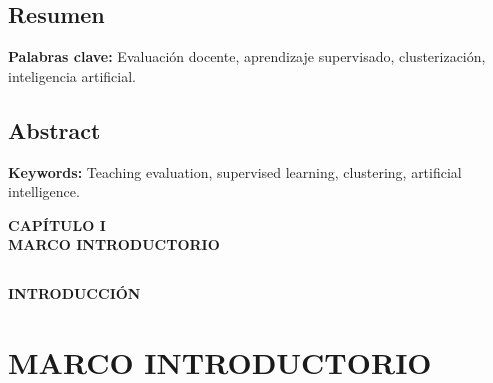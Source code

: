 \documentclass[12pt,oneside,letterpaper]{book}
\begin{document}
\newpage
\thispagestyle{empty}
\renewcommand{\listtablename}{ÍNDICE DE TABLAS}
\renewcommand{\cftlottitlefont}{\large\bfseries}
\renewcommand{\cfttabdotsep}{\cftdotsep}
\listoftables

\newpage
\thispagestyle{empty}
\renewcommand{\listfigurename}{ÍNDICE DE IMÁGENES}
\renewcommand{\cftloftitlefont}{\large\bfseries}
\renewcommand{\cftfigdotsep}{\cftdotsep}
\listoffigures

\newpage
{} %
\section*{Resumen}
\lipsum[1]

\bigskip
\noindent \textbf{Palabras clave:} Evaluación docente, aprendizaje supervisado, clusterización, inteligencia artificial.

\newpage
\section*{Abstract}
\lipsum[1]

\bigskip
\noindent \textbf{Keywords:} Teaching evaluation, supervised learning, clustering, artificial intelligence.

\newpage
{}
\thispagestyle{empty}
\vspace*{0.35\textheight}
\begin{center}
	{\Huge\textbf{CAPÍTULO I}} \\[0.5cm]
	{\Huge\textbf{MARCO INTRODUCTORIO}}
\end{center}
\newpage
\thispagestyle{fancy}

\section*{}
\begin{center}
	\large \textbf{INTRODUCCIÓN}
\end{center}

\chapter{MARCO INTRODUCTORIO}
\thispagestyle{fancy}
\end{document}
